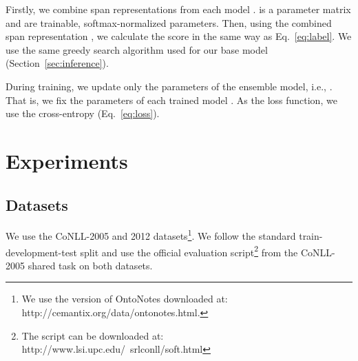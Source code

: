 \documentclass[11pt,a4paper]{article}
\begin{document}
\noindent
Firstly, we combine span representations  from each model .
 is a parameter matrix and  are trainable, softmax-normalized parameters.
Then, using the combined span representation , we calculate the score in the same way as Eq.~\ref{eq:label}.
We use the same greedy search algorithm used for our base model (Section~\ref{sec:inference}).

During training, we update only the parameters of the ensemble model, i.e., .
That is, we fix the parameters of each trained model .
As the loss function, we use the cross-entropy (Eq.~\ref{eq:loss}).



\section{Experiments}
\label{sec:exp}

\subsection{Datasets}
We use the CoNLL-2005 and 2012 datasets\footnote{We use the version of OntoNotes downloaded at: http://cemantix.org/data/ontonotes.html.}.
We follow the standard train-development-test split and use the official evaluation script\footnote{The script can be downloaded at: http://www.lsi.upc.edu/~srlconll/soft.html} from the CoNLL-2005 shared task on both datasets.
\end{document}
